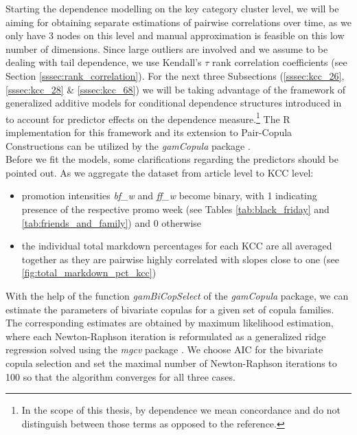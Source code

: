 
Starting the dependence modelling on the key category cluster level, we will be aiming for obtaining separate estimations of pairwise correlations over time, as we only have 3 nodes on this level and manual approximation is feasible on this low number of dimensions. Since large outliers are involved and we assume to be dealing with tail dependence, we use Kendall's $\tau$ rank correlation coefficients (see Section \ref{sssec:rank_correlation}). For the next three Subsections (\ref{sssec:kcc_26}, \ref{sssec:kcc_28} \& \ref{sssec:kcc_68}) we will be taking advantage of the framework of generalized additive models for conditional dependence structures introduced in \cite{vatter2015generalized} to account for predictor effects on the dependence measure.\footnote{In the scope of this thesis, by dependence we mean concordance and do not distinguish between those terms as opposed to the reference.} The R implementation for this framework and its extension to Pair-Copula Constructions \citep{vatter2018generalized} can be utilized by the \textit{gamCopula} package \citep{vatter2019gamcopula}. \\

Before we fit the models, some clarifications regarding the predictors should be pointed out. As we aggregate the dataset from article level to \ac{KCC} level:
\begin{itemize}
\item promotion intensities \textit{bf\_w} and \textit{ff\_w} become binary, with 1 indicating presence of the respective promo week (see Tables \ref{tab:black_friday} and \ref{tab:friends_and_family}) and 0 otherwise
\item the individual total markdown percentages for each \ac{KCC} are all averaged together as they are pairwise highly correlated with slopes close to one (see \autoref{fig:total_markdown_pct_kcc})
\end{itemize}

With the help of the function \textit{gamBiCopSelect} of the \textit{gamCopula} package, we can estimate the parameters of bivariate copulas for a given set of copula families. The corresponding estimates are obtained by maximum likelihood estimation, where each Newton-Raphson iteration is reformulated as a generalized ridge regression solved using the \textit{mgcv} package \citep{wood2017generalized}. We choose \ac{AIC} for the bivariate copula selection and set the maximal number of Newton-Raphson iterations to 100 so that the algorithm converges for all three cases.\\

